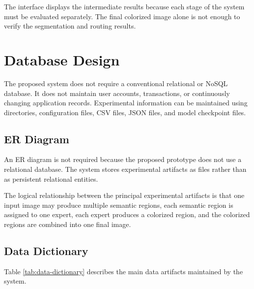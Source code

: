 \documentclass{FastFyp}
\begin{document}
The interface displays the intermediate results because each stage of the system must be evaluated separately. The final colorized image alone is not enough to verify the segmentation and routing results.

\section{Database Design}

The proposed system does not require a conventional relational or NoSQL database. It does not maintain user accounts, transactions, or continuously changing application records. Experimental information can be maintained using directories, configuration files, CSV files, JSON files, and model checkpoint files.

\subsection{ER Diagram}

An ER diagram is not required because the proposed prototype does not use a relational database. The system stores experimental artifacts as files rather than as persistent relational entities.

The logical relationship between the principal experimental artifacts is that one input image may produce multiple semantic regions, each semantic region is assigned to one expert, each expert produces a colorized region, and the colorized regions are combined into one final image.

\subsection{Data Dictionary}

Table \ref{tab:data-dictionary} describes the main data artifacts maintained by the system.
\end{document}
